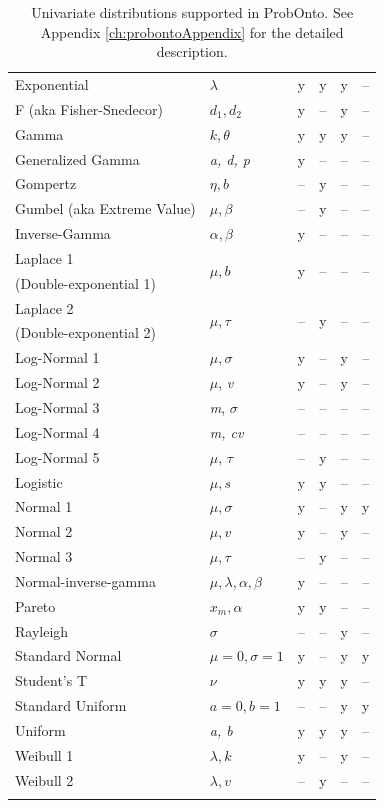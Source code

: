 {\begin{center}
\begin{longtable}{l | lcccc}
Exponential			& $\lambda$		&	y	&	y	&	y	&  -- \\
F (aka Fisher-Snedecor)	& $d_1, d_2$		&	y	& --  &	y	&  -- \\
Gamma				& $k, \theta$		&	y	&	y	&	y	&  -- \\
Generalized Gamma	& \emph{a, d, p}	&	y	& --  & --  & --	  \\
Gompertz				& $\eta, b$		& --  &	y	& --  & --	  \\
Gumbel (aka Extreme Value)	& $\mu, \beta$	& --  &	y 	& --  & -- \\ 
Inverse-Gamma		& $\alpha, \beta$	&	y	& --  & --  &  -- \\
Laplace 1				& \multirow{2}{*}{$\mu, b$} &	\multirow{2}{*}{y}	&	\multirow{2}{*}{--}	& \multirow{2}{*}{--}  & \multirow{2}{*}{--} \\ [-0.5ex]
(Double-exponential 1) \\
Laplace 2				& \multirow{2}{*}{$\mu, \tau$} &	\multirow{2}{*}{--}	&	\multirow{2}{*}{y}	& \multirow{2}{*}{--}  & \multirow{2}{*}{--} \\ [-0.5ex]
(Double-exponential 2) \\[0.5ex]
Log-Normal 1			& $\mu, \sigma$	&	y	&	--	&	y	&  -- \\
Log-Normal 2			& $\mu$, \textit{v}	&	y	&	--	&	y	&  -- \\
Log-Normal 3			& \emph{m}, $\sigma$	&	--	&	--	&	--	&  -- \\
Log-Normal 4			& \emph{m, cv}		& 	--	&	--	&	--	&  -- \\
Log-Normal 5			& $\mu$, $\tau$	& 	--	&	y	&	--	&  -- \\[0.5ex]
Logistic				& $\mu, s$		&	y	&	y	& --  &  -- \\[0.5ex]
Normal 1				& $\mu, \sigma$	&	y	&	--	&	y	& y  \\
Normal 2				& $\mu, v$		&	y	&	--	&	y	&  -- \\
Normal 3				& $\mu, \tau$		&	--	&	y	&	--	&  -- \\[0.5ex]
Normal-inverse-gamma	& $\mu, \lambda, \alpha, \beta$	& y	& --  & --  &  -- \\
Pareto				& $x_m, \alpha$	& y	& y	& --  &  -- \\
Rayleigh				& $\sigma$		& --  & --  & y	&  -- \\
Standard Normal 		& $\mu\!=\!0, \sigma\!=\!1$	& y & -- &	 y & y  \\
Student's T			& $\nu$			& y	& y	& y	&  -- \\
Standard Uniform		& $a\!=\!0, b\!=\!1$		& --	& --	& y & y  \\
Uniform				&  \emph{a, b}		& y	& y	& y		& --  \\
Weibull 1				& $\lambda, k$		& y	& --	& y	&  -- \\
Weibull 2				& $\lambda, v$		& --	& y	& --	&  -- \\
   \hline 
\caption{Univariate distributions supported in ProbOnto. See Appendix \ref{ch:probontoAppendix} 
for the detailed description.}
\label{figTable:univariates}
\vspace{-2.5em}
\end{longtable}
\end{center}

}
